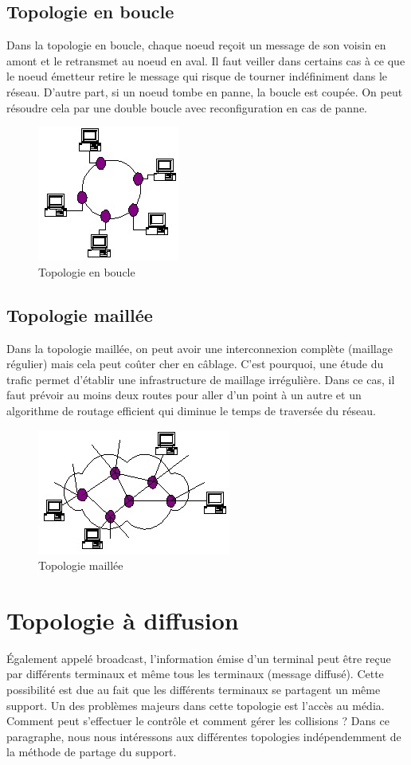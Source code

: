 	\subsection{Topologie en boucle}
	Dans la topologie en boucle, chaque noeud reçoit un message de son voisin en amont et le retransmet au noeud en aval. Il faut veiller dans certains cas à ce que le noeud émetteur retire le message qui risque de tourner indéfiniment dans le réseau. D'autre part, si un noeud tombe en panne, la boucle est coupée. On peut résoudre cela par une double boucle avec reconfiguration en cas de panne.
\begin{figure}[H]
	\centering
	\includegraphics{partie1/topoboucle.jpg}
	\caption{Topologie en boucle}
\end{figure}
	\subsection{Topologie maillée}
	Dans la topologie maillée, on peut avoir une interconnexion complète (maillage régulier) mais cela peut coûter cher en câblage. C'est pourquoi, une étude du trafic permet d'établir une infrastructure de maillage irrégulière. Dans ce cas, il faut prévoir au moins deux routes pour aller d'un point à un autre et un algorithme de routage efficient qui diminue le temps de traversée du réseau. 
\begin{figure}[H]
	\centering
	\includegraphics{partie1/topomaille.jpg}
	\caption{Topologie maillée}
\end{figure}
\section{Topologie à diffusion}
\'Egalement appelé broadcast, l'information émise d'un terminal peut être reçue par différents terminaux et même tous les terminaux (message diffusé). Cette possibilité est due au fait que les différents terminaux se partagent un même support. Un des problèmes majeurs dans cette topologie est l'accès au média. Comment peut s'effectuer le contrôle et comment gérer les collisions ? Dans ce paragraphe, nous nous intéressons aux différentes topologies indépendemment de la méthode de partage du support.


